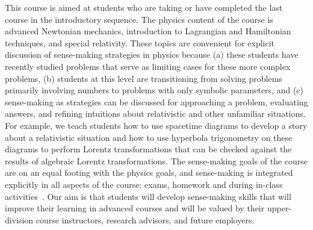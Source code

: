 \documentclass[english,aps,pra,reprint,noshowpacs,superscriptaddress]{revtex4-1}
\begin{document}
This course is aimed at students who are taking
or have completed the last course in the introductory sequence. The
physics content of the course is advanced Newtonian mechanics,
introduction to Lagrangian and Hamiltonian techniques, and special
relativity. These topics are convenient
for explicit discussion of sense-making strategies in physics because
(a) these students have recently studied problems that serve as limiting
cases for these more complex problems, (b) students at this level are
transitioning from solving problems primarily involving numbers to
problems with only symbolic parameters, and (c) sense-making as strategies 
can be discussed for approaching a problem, evaluating
answers, and refining intuitions about relativistic and other
unfamiliar situations. For example, we teach students how to use
spacetime diagrams to develop a story about a relativistic situation
and how to use hyperbola trigonometry on these diagrams to perform Lorentz
transformations that can be checked against the results of algebraic
Lorentz transformations.  The sense-making goals of the course are on
an equal footing with the physics goals, and sense-making is integrated
explicitly in all aspects of the course: exams, homework and during
in-class activities~\cite{lenz2017sensemaking, hahn2017sensemaking}. Our aim is that students will develop
sense-making skills that will improve their learning in advanced
courses and will be valued by their upper-division course instructors,
research advisors, and future employers.

\end{document}

